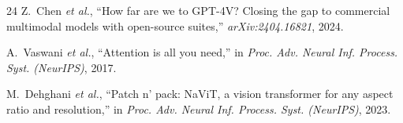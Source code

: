 \documentclass[journal]{IEEEtran}
\begin{document}
\begin{thebibliography}{24}
Z.~Chen \emph{et al.}, ``How far are we to GPT-4V? Closing the gap to commercial multimodal models with open-source suites,'' \emph{arXiv:2404.16821}, 2024.

A.~Vaswani \emph{et al.}, ``Attention is all you need,'' in \emph{Proc. Adv. Neural Inf. Process. Syst. (NeurIPS)}, 2017.

M.~Dehghani \emph{et al.}, ``Patch n' pack: NaViT, a vision transformer for any aspect ratio and resolution,'' in \emph{Proc. Adv. Neural Inf. Process. Syst. (NeurIPS)}, 2023.

\end{thebibliography}

\end{document}
